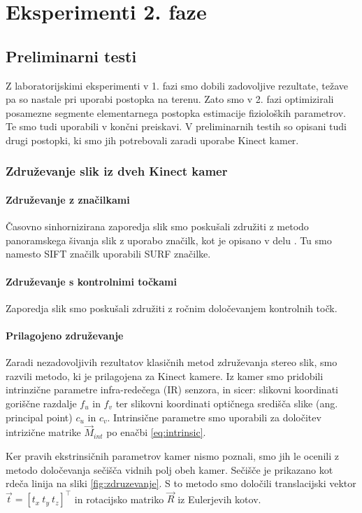 \section{Eksperimenti 2. faze}
\subsection{Preliminarni testi}
Z laboratorijskimi eksperimenti v 1. fazi smo dobili zadovoljive rezultate, težave pa so nastale pri uporabi postopka na terenu. Zato smo v 2. fazi optimizirali posamezne segmente elementarnega postopka estimacije fizioloških parametrov. Te smo tudi uporabili v končni preiskavi. V preliminarnih testih so opisani tudi drugi postopki, ki smo jih potrebovali zaradi uporabe Kinect kamer.


\subsubsection{Združevanje slik iz dveh Kinect kamer}\label{sec:zdruzevanje}

\paragraph{Združevanje z značilkami}
Časovno sinhornizirana zaporedja slik smo poskušali združiti z metodo panoramskega šivanja slik z uporabo značilk, kot je opisano v delu \cite{brown2007automatic}. Tu smo namesto SIFT značilk uporabili SURF značilke.


\paragraph{Združevanje s kontrolnimi točkami}
Zaporedja slik smo poskušali združiti z ročnim določevanjem kontrolnih točk.


\paragraph{Prilagojeno združevanje}
Zaradi nezadovoljivih rezultatov klasičnih metod združevanja stereo slik, smo razvili metodo, ki je prilagojena za Kinect kamere. Iz kamer smo pridobili intrinzične parametre infra-redečega (IR) senzora, in sicer: slikovni koordinati goriščne razdalje $f_u$ in $f_v$ ter slikovni koordinati optičnega središča slike (ang. principal point) $c_u$ in $c_v$. Intrinsične parametre smo uporabili za določitev intrizične matrike $\vec{M}_{int}$ po enačbi \eqref{eq:intrinsic}.


Ker pravih ekstrinsičnih parametrov kamer nismo poznali, smo jih le ocenili z metodo določevanja sečišča vidnih polj obeh kamer. Sečišče je prikazano kot rdeča linija na sliki \ref{fig:zdruzevanje}. S to metodo smo določili translacijski vektor $\vec{t} = \left [ t_x~ t_y~ t_z \right]^\top$ in rotacijsko matriko $\vec{R}$ iz Eulerjevih kotov.

